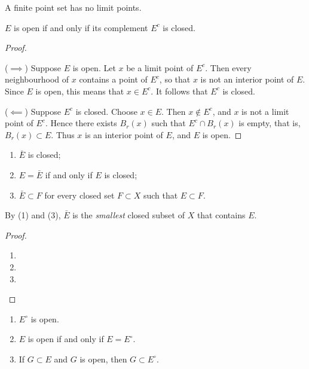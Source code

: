 \begin{corollary}
A finite point set has no limit points.
\end{corollary}

\begin{proposition}
$E$ is open if and only if its complement $E^c$ is closed.
\end{proposition}

\begin{proof} \

($\implies$) Suppose $E$ is open. Let $x$ be a limit point of $E^c$. Then every neighbourhood of $x$ contains a point of $E^c$, so that $x$ is not an interior point of $E$. Since $E$ is open, this means that $x\in E^c$. It follows that $E^c$ is closed.

($\impliedby$) Suppose $E^c$ is closed. Choose $x\in E$. Then $x\notin E^c$, and $x$ is not a limit point of $E^c$. Hence there exists $B_r(x)$ such that $E^c\cap B_r(x)$ is empty, that is, $B_r(x)\subset E$. Thus $x$ is an interior point of $E$, and $E$ is open.
\end{proof}

\begin{proposition}
\begin{enumerate}[label=(\arabic*)]
\item $\bar{E}$ is closed;
\item $E=\bar{E}$ if and only if $E$ is closed;
\item $\bar{E}\subset F$ for every closed set $F\subset X$ such that $E\subset F$.
\end{enumerate}
By (1) and (3), $\bar{E}$ is the \emph{smallest} closed subset of $X$ that contains $E$.
\end{proposition}

\begin{proof} \
\begin{enumerate}[label=(\arabic*)]
\item 
\item 
\item 
\end{enumerate}
\end{proof}

\begin{proposition}
\begin{enumerate}[label=(\arabic*)]
\item $E^\circ$ is open.
\item $E$ is open if and only if $E=E^\circ$.
\item If $G\subset E$ and $G$ is open, then $G\subset E^\circ$.
\end{enumerate}
\end{proposition}

